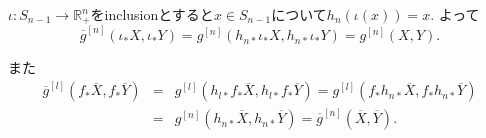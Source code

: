 \documentclass{jsarticle}
\newcommand{\RR}{\mathbb{R}}
\theoremstyle{definition}
\numberwithin{theorem}{section}
\begin{document}
$\iota:S_{n-1}\rightarrow \RR^n_+$をinclusionとすると$x \in S_{n-1}$について$h_n(\iota(x))=x$.
よって
\[
\overline{g}^{[n]}(\iota_* X, \iota_* Y)=g^{[n]}(h_{n*}  \iota_* X, h_{n*} \iota_* Y)=g^{[n]}(X,Y).
\]

また
\begin{eqnarray*}
\overline{g}^{[l]}(f_* \overline{X}, f_* \overline{Y})&=&g^{[l]}(h_{l*} f_* \overline{X}, h_{l*} f_* \overline{Y})=g^{[l]}(f_* h_{n*} \overline{X}, f_* h_{n*} \overline{Y})\\
&=&g^{[n]}(h_{n*} \overline{X}, h_{n*} \overline{Y})=\overline{g}^{[n]}(\overline{X}, \overline{Y}).
\end{eqnarray*}
\end{document}
